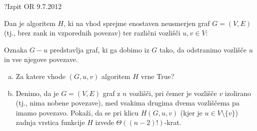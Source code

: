 \begin{naloga}{?}{Izpit OR 9.7.2012}
\begin{vprasanje}[hamilton]
Dan je algoritem $H$,
ki na vhod sprejme enostaven neusmerjen graf $G = (V, E)$
(tj., brez zank in vzporednih povezav)
ter različni vozlišči $u, v \in V$:
\begin{small}
\begin{algorithmic}
        \State {}
    \EndIf
            \State {}
        \EndIf
    \EndFor
    \State {}
\EndFunction
\end{algorithmic}
\end{small}
Oznaka $G - u$ predstavlja graf,
ki ga dobimo iz $G$ tako, da odstranimo vozlišče $u$ in vse njegove povezave.

\begin{enumerate}[(a)]
\item Za katere vhode $(G, u, v)$ algoritem $H$ vrne {\sc True}?

\item Denimo, da je $G = (V, E)$ graf z $n$ vozlišči,
pri čemer je vozlišče $v$ izolirano (tj., nima nobene povezave),
med vsakima drugima dvema vozliščema pa imamo povezavo.
Pokaži, da se pri klicu $H(G, u, v)$ (kjer je $u \in V \setminus \{v\}$)
zadnja vrstica funkcije $H$ izvede $\Theta((n-2)!)$-krat.
\end{enumerate}
\end{vprasanje}
\begin{odgovor}
\end{odgovor}
\end{naloga}


